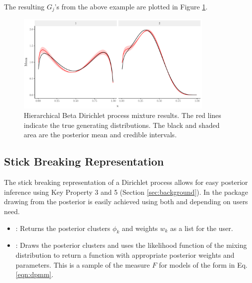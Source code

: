 \documentclass[nojss]{jss}
\begin{document}
The resulting $G_j$'s from the above example are plotted in Figure \ref{fig:hierBeta}.
\begin{figure}
\centering
\includegraphics[width=0.85\textwidth]{img/hierBetaGraph.pdf}
\caption{Hierarchical Beta Dirichlet process mixture results. The red lines indicate the true generating distributions. The black and shaded area are the posterior mean and credible intervals.}
\label{fig:hierBeta}
\end{figure}


\subsection{Stick Breaking Representation}
The stick breaking representation of a Dirichlet process allows for easy posterior inference using Key Property 3 and 5 (Section \ref{sec:background}). In the  package drawing from the posterior is easily achieved using both  and  depending on users need.
\begin{itemize}
\item {}: Returns the posterior clusters $\phi _k$ and weights $w_k$ as a list for the user.
\item {}: Draws the posterior clusters and uses the likelihood function of the mixing distribution to return a function with appropriate posterior weights and parameters. This is a sample of the measure $F$ for models of the form in Eq. \eqref{eqn:dpmm}.
\end{itemize}
\end{document}

